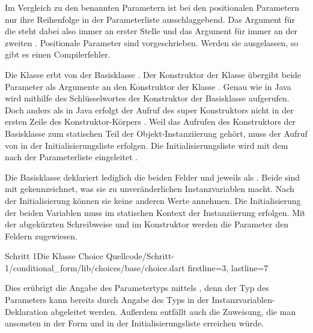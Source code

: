 Im Vergleich zu den benannten Parametern ist bei den positionalen Parametern nur ihre Reihenfolge in der Parameterliste ausschlaggebend.
Das Argument für die  steht dabei also immer an erster Stelle und das Argument für  immer an der zweiten .
Positionale Parameter sind vorgeschrieben.
Werden sie ausgelassen, so gibt es einen Compilerfehler.

Die Klasse  erbt von der Basisklasse  .
Der Konstruktor der Klasse  übergibt beide Parameter als Argumente an den Konstruktor der Klasse .
Genau wie in Java wird mithilfe des Schlüsselwortes  der Konstruktor der Basisklasse aufgerufen.
Doch anders als in Java erfolgt der Aufruf des super Konstruktors nicht in der ersten Zeile des Konstruktor-Körpers .
Weil das Aufrufen des Konstruktors der Basisklasse zum statischen Teil der Objekt-Instanziierung gehört, muss der Aufruf von  in der Initialisierungsliste erfolgen.
Die Initialisierungsliste wird mit dem \IC{:} nach der Parameterliste eingeleitet .

Die Basisklasse  \Lst{\ref{lst:Schritt1KlasseChoice}} deklariert lediglich die beiden Felder  und  jeweils als  .
Beide sind mit  gekennzeichnet, was sie zu unveränderlichen Instanzvariablen macht.
Nach der Initialisierung können sie keine anderen Werte annehmen.
 Die Initialisierung der beiden Variablen muss im statischen Kontext der Instanziierung erfolgen.
Mit der abgekürzten Schreibweise  und   im Konstruktor  werden die Parameter den Feldern zugewiesen.

\begin{alexlisting}{Schritt 1}{Die Klasse Choice}
  {Quellcode/Schritt-1/conditional_form/lib/choices/base/choice.dart}
  {firstline=3, lastline=7}
  \label{lst:Schritt1KlasseChoice}
\end{alexlisting}

Dies erübrigt die Angabe des Parametertyps mittels , denn der Typ des Parameters kann bereits durch Angabe des Typs in der Instanzvariablen-Deklaration  abgeleitet werden.
Außerdem entfällt auch die Zuweisung, die man ansonsten in der Form  und  in der Initialisierungsliste erreichen würde.


